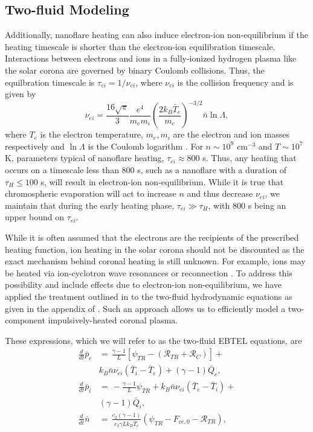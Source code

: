 \documentclass[apj]{emulateapj}
\begin{document}
	\subsection{Two-fluid Modeling}
	\label{subsec:two_fluid_theory}
	\par Additionally, nanoflare heating can also induce electron-ion non-equilibrium if the heating timescale is shorter than the electron-ion equilibration timescale. Interactions between electrons and ions in a fully-ionized hydrogen plasma like the solar corona are governed by binary Coulomb collisions. Thus, the equilbration timescale is $\tau_{ei}=1/\nu_{ei}$, where $\nu_{ei}$ is the collision frequency and is given by
	\begin{equation}
		\nu_{ei} = \frac{16\sqrt{\pi}}{3}\frac{e^4}{m_em_i}\left(\frac{2k_B\bar{T}_e}{m_e}\right)^{-3/2}\bar{n}\ln{\Lambda},
	\end{equation}
	where $T_e$ is the electron temperature, $m_e,m_i$ are the electron and ion masses respectively and $\ln{\Lambda}$ is the Coulomb logarithm \citep[see Eq. 2.5e and Section 3 of][]{braginskii_transport_1965}. For $n\sim10^9$ cm$^{-3}$ and $T\sim10^{7}$ K, parameters typical of nanoflare heating, $\tau_{ei}\approx800$ s. Thus, any heating that occurs on a timescale less than 800 s, such as a nanoflare with a duration of $\tau_H\le100$ s, will result in electron-ion non-equilibrium. While it is true that chromospheric evaporation will act to increase $n$ and thus decrease $\nu_{ei}$, we maintain that during the early heating phase, $\tau_{ei}\gg\tau_H$, with 800 s being an upper bound on $\tau_{ei}$. 
	\par While it is often assumed that the electrons are the recipients of the prescribed heating function, ion heating in the solar corona should not be discounted as the exact mechanism behind coronal heating is still unknown. For example, ions may be heated via ion-cyclotron wave resonances \citep{markovskii_intermittent_2004} or reconnection \citep{ono_ion_1996,drake_onset_2014}. To address this possibility and include effects due to electron-ion non-equilibrium, we have applied the treatment outlined in \citet{klimchuk_highly_2008} to the two-fluid hydrodynamic equations as given in the appendix of \citet{bradshaw_influence_2013}. Such an approach allows us to efficiently model a two-component impulsively-heated coronal plasma.
	\par These expressions, which we will refer to as the two-fluid EBTEL equations, are
	\begin{align}
		\frac{d}{dt}\bar{p}_e &=\,\frac{\gamma - 1}{L}[\psi_{TR} - (\mathcal{R}_{TR} + \mathcal{R}_C)] + \nonumber \\ & k_B\bar{n}\nu_{ei}(\bar{T}_i-\bar{T}_e) + (\gamma-1)\bar{Q}_{e},\label{eq:press_e_0d_2fl} \\[0.5em]
		\frac{d}{dt}\bar{p}_i &=\,-\frac{\gamma - 1}{L}\psi_{TR} + k_B\bar{n}\nu_{ei}(\bar{T}_e-\bar{T}_i) + \nonumber \\ &(\gamma-1)\bar{Q}_{i},\label{eq:press_i_0d_2fl} \\[0.5em]
		\frac{d}{dt}\bar{n} &=\,\frac{c_2(\gamma-1)}{c_3\gamma Lk_B\bar{T}_e}(\psi_{TR} - F_{ce,0}-\mathcal{R}_{TR}),	\label{eq:mass_0d_2fl}
	\end{align}
\end{document}
